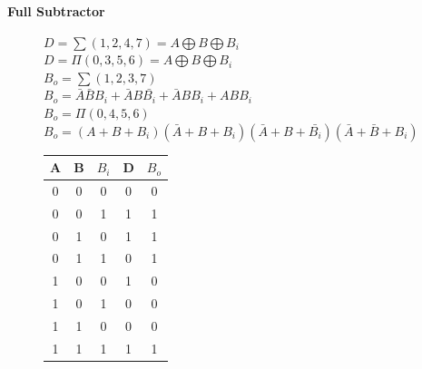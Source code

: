 \documentclass[12pt]{article}
\begin{document}
\newpage
\begin{center}
    \large{\textbf{Full Subtractor}}
\end{center}

\begin{figure}[h!]
    \begin{minipage}{0.7\textwidth}
       $D=\sum(1,2,4,7)=A\bigoplus B\bigoplus B_i$\\
       $D=\Pi(0,3,5,6)=A\bigoplus B\bigoplus B_i$\\
       $B_o=\sum(1,2,3,7)$\\
       $B_o=\bar{A}\bar{B}B_i+\bar{A}B\bar{B_i}+\bar{A}BB_{i}+ABB_{i}$\\
       $B_o=\Pi(0,4,5,6)$\\
       $B_o=(A+B+B_i)(\bar{A}+B+B_i)(\bar{A}+B+\bar{B_i})(\bar{A}+\bar{B}+B_i)$\\
    \end{minipage}
    \hfill
    \begin{minipage}{0.28\textwidth}
        \begin{tabular}{|c|c|c|c|c|}
            \hline
            A & B & $B_{i}$ & D & $B_{o}$ \\ \hline
            0 & 0 & 0 & 0 & 0 \\ \hline
            0 & 0 & 1 & 1 & 1 \\ \hline
            0 & 1 & 0 & 1 & 1 \\ \hline
            0 & 1 & 1 & 0 & 1 \\ \hline
            1 & 0 & 0 & 1 & 0 \\ \hline
            1 & 0 & 1 & 0 & 0 \\ \hline
            1 & 1 & 0 & 0 & 0 \\ \hline
            1 & 1 & 1 & 1 & 1 \\ \hline
        \end{tabular}
    \end{minipage}
\end{figure}
\end{document}
